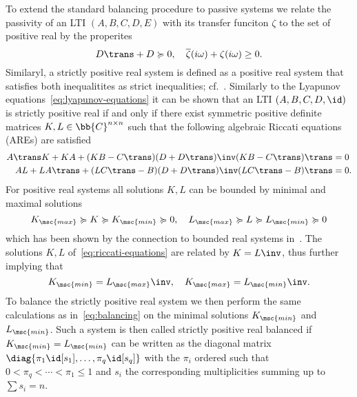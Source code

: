 To extend the standard balancing procedure to passive systems we relate the passivity of an LTI $(A, B, C, D, E)$ with its transfer funciton $\zeta$ to the set of positive real by the properites
\begin{equation*}
    D\trans + D \succcurlyeq 0,\quad \overline{\zeta}(i \omega) + \zeta(i \omega) \geq 0.
\end{equation*}
Similaryl, a strictly positive real system is defined as a positive real system that satisfies both inequalitites as strict inequalities; cf.~\cite[Section~5]{Gugercin2007}.
Similarly to the Lyapunov equations~\eqref{eq:lyapunov-equations} it can be shown that an LTI $(A, B, C, D, \id)$ is strictly positive real if and only if there exist symmetric positive definite matrices $K, L \in \bb{C}^{n \times n}$ such that the following algebraic Riccati equations (AREs) are satisfied
\begin{equation}\label{eq:riccati-equations}
    \begin{aligned}
        A\trans K + K A + (K B - C\trans) (D + D\trans)\inv (K B - C\trans)\trans &= 0 \\
        A L + L A\trans + (L C\trans - B) (D + D\trans)\inv (L C\trans - B)\trans &= 0.
    \end{aligned}
\end{equation}
For positive real systems all solutions $K, L$ can be bounded by minimal and maximal solutions
\begin{equation*}
    K_{\msc{max}} \succcurlyeq K \succcurlyeq K_{\msc{min}} \succcurlyeq 0,\quad L_{\msc{max}} \succcurlyeq L \succcurlyeq L_{\msc{min}} \succcurlyeq 0
\end{equation*}
which has been shown by the connection to bounded real systems in~\cite[Proposition~5.1]{Ober1991}.
The solutions $K, L$ of~\eqref{eq:riccati-equations} are related by $K = L\inv$, thus further implying that
\begin{equation*}
    K_{\msc{min}} = L_{\msc{max}}\inv,\quad K_{\msc{max}} = L_{\msc{min}}\inv.
\end{equation*}
To balance the strictly positive real system we then perform the same calculations as in~\eqref{eq:balancing} on the minimal solutions $K_{\msc{min}}$ and $L_{\msc{min}}$.
Such a system is then called strictly positive real balanced if $K_{\msc{min}} = L_{\msc{min}}$ can be written as the diagonal matrix $\diag{\pi_1 \id[s_1], \dots, \pi_q \id[s_q]}$ with the $\pi_i$ ordered such that $0 < \pi_q < \cdots < \pi_1 \leq 1$ and $s_i$ the corresponding multiplicities summing up to $\sum s_i = n$.

